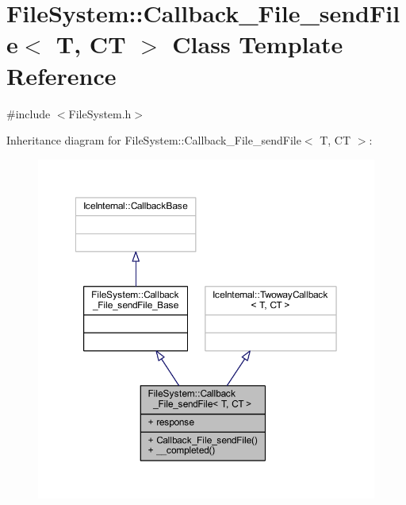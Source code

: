 \hypertarget{class_file_system_1_1_callback___file__send_file}{}\section{File\+System\+:\+:Callback\+\_\+\+File\+\_\+send\+File$<$ T, C\+T $>$ Class Template Reference}
\label{class_file_system_1_1_callback___file__send_file}


{\ttfamily \#include $<$File\+System.\+h$>$}



Inheritance diagram for File\+System\+:\+:Callback\+\_\+\+File\+\_\+send\+File$<$ T, C\+T $>$\+:
\nopagebreak
\begin{figure}[H]
\begin{center}
\leavevmode
\includegraphics[width=350pt]{class_file_system_1_1_callback___file__send_file__inherit__graph}
\end{center}
\end{figure}


